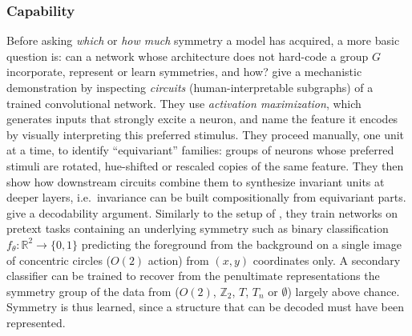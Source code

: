 \documentclass[mathematics,review,submit,moreauthors]{Definitions/mdpi}
\begin{document}
\subsubsection{Capability}\label{sec:disco-capability}
Before asking \emph{which} or \emph{how much} symmetry a model has acquired, a more basic question is: can a network whose architecture does not hard-code a group $G$ incorporate, represent or learn symmetries, and how?
\citet{olah2020d} give a mechanistic demonstration by inspecting \emph{circuits} (human-interpretable subgraphs) of a trained convolutional network.
They use \emph{activation maximization}, which generates inputs that strongly excite a neuron, and name the feature it encodes by visually interpreting this preferred stimulus.
They proceed manually, one unit at a time, to identify ``equivariant'' families: groups of neurons whose preferred stimuli are rotated, hue-shifted or rescaled copies of the same feature.
They then show how downstream circuits combine them to synthesize invariant units at deeper layers, i.e.\ invariance can be built compositionally from equivariant parts.
\citet{barenboim2021sp} give a decodability argument.
Similarly to the setup of , they train networks on pretext tasks containing an underlying symmetry such as binary classification $f_\theta: \mathbb{R}^2 \to \{0, 1\}$ predicting the foreground from the background on a single image of concentric circles ($O(2)$ action) from $(x,y)$ coordinates only.
A secondary classifier can be trained to recover from the penultimate representations the symmetry group of the data from ($O(2)$, $\mathbb{Z}_2$, $T$, $T_n$ or $\emptyset$) largely above chance.
Symmetry is thus learned, since a structure that can be decoded must have been represented.
\end{document}

